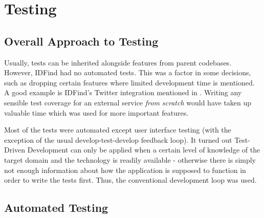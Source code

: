 \chapter{Testing}



\section{Overall Approach to Testing}
\label{testing-intro}
Usually, tests can be inherited alongside features from parent codebases. However, IDFind had no automated tests. This was a factor in some decisions, such as dropping certain features where limited development time is mentioned. A good example is IDFind's Twitter integration mentioned in . Writing any sensible test coverage for an external service \emph{from scratch} would have taken up valuable time which was used for more important features.

Most of the tests were automated except user interface testing (with the exception of the usual develop-test-develop feedback loop). It turned out Test-Driven Development can only be applied when a certain level of knowledge of the target domain and the technology is readily available - otherwise there is simply not enough information about how the application is supposed to function in order to write the tests first. Thus, the conventional development loop was used.


\section{Automated Testing}

